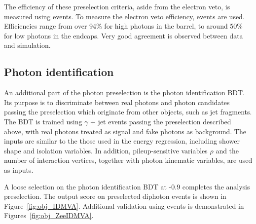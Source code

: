 The efficiency of these preselection criteria, aside from the electron veto, is measured using \Zee events.
To measure the electron veto efficiency, \Zmumug events are used.
Efficiencies range from over 94\% for high \RNINE photons in the barrel, 
to around 50\% for low \RNINE photons in the endcaps.
Very good agreement is observed between data and simulation. %

\subsection{Photon identification}
\label{sec:objects_PhotonIDBDT}

An additional part of the photon preselection is the photon identification BDT.
Its purpose is to discriminate between real photons and photon candidates passing the preselection which originate from other objects, 
such as jet fragments.
The BDT is trained using $\gamma$ + jet events passing the preselection described above, with real photons treated as signal and fake photons as background.
The inputs are similar to the those used in the energy regression, 
including shower shape and isolation variables.
In addition, pileup-sensitive variables $\rho$ and the number of interaction vertices, 
together with photon kinematic variables, are used as inputs.

A loose selection on the photon identification BDT at -0.9 completes the analysis preselection.
The output score on preselected diphoton events is shown in Figure~\ref{fig:obj_IDMVA}.
Additional validation using \Zee events is demonstrated in Figures~\ref{fig:obj_ZeeIDMVA}.

